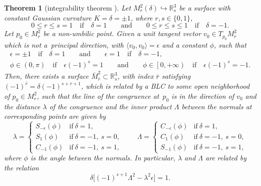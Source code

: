 \documentclass[pdftex]{sigma}
\numberwithin{equation}{section}
\newtheorem{Theorem}{Theorem}[section]
\begin{document}
\begin{Theorem}[integrability theorem \cite{KRT2022}] \label{th:integrabilitytheorem}
Let $M_r^2(\delta)\hookrightarrow{\mathbb{R}}^3_s$ be a surface with constant Gaussian curvature
 $K=\delta=\pm 1$, where $r,s\in\{0,1\}$,
\begin{equation}\label{eq:rs}
0\leq r\leq s= 1 \quad \mbox{if} \quad \delta=1 \qquad \mbox{and}\qquad
0\leq r\leq s\leq 1 \quad \mbox{if}\quad \delta=-1.
\end{equation}
Let $p_0\in M_r^2$ be a non-umbilic point. Given a unit tangent vector ${v}_0\in T_{p_0}M^2_r$ which is not a~principal direction, with $\langle {v}_0,{v}_0\rangle=\epsilon$ and a constant $\phi$, such that
\begin{gather}
\epsilon=\pm 1 \quad\mbox{if} \quad \delta=1 \qquad\mbox{and}\qquad
\epsilon=1 \quad \mbox{if} \quad \delta=-1,
\label{eq:epphi}\\
\phi\in (0,\pi) \quad \mbox{if} \quad \epsilon(-1)^s=1 \qquad\mbox{and}\qquad
\phi\in \left[ 0,+\infty\right) \quad \mbox{if} \quad \epsilon(-1)^s=-1.\nonumber
\end{gather}
Then, there exists a surface $\bar{M}^2_{\bar{r}}\subset{\mathbb{R}}^3_s$, with index $\bar{r}$ satisfying $
(-1)^{\bar{r}}=\delta (-1)^{s+r+1}$,
which is related by a BLC to some open neighborhood of $p_0\in M_r^2$, such that the line of the congruence at~$p_0$ is in the direction of ${v}_0$ and the distance $\lambda$ of the congruence and the inner product $\Lambda$ between the normals at corresponding points
are given by
\begin{equation*}%
\lambda=
\begin{cases}
S_{-\epsilon}(\phi)&\mbox{if}\ \delta=1,\\
S_1(\phi)&\mbox{if}\ \delta=-1,\ s=0,\\
C_{-1}(\phi)&\mbox{if}\ \delta=-1, \ s=1,
\end{cases} \qquad
\Lambda=
\begin{cases}
C_{-\epsilon}(\phi)&\mbox{if}\ \delta=1,\\
C_1(\phi)&\mbox{if}\ \delta=-1, \ s=0,\\
S_{-1}(\phi)&\mbox{if}\ \delta=-1, \ s=1,
\end{cases}
\end{equation*}
\noindent where $\phi$ is the angle between the normals.
 In particular, $\lambda$ and $\Lambda$ are related by the relation
\begin{equation}\label{eq:lambdaephi}
\delta \bigl[ (-1)^{s+1}\Lambda^2-\lambda^2\epsilon \bigr]=1.
\end{equation}
\end{Theorem}
\end{document}

